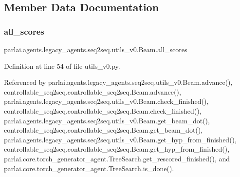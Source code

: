 \subsection{Member Data Documentation}
\mbox{\label{classparlai_1_1agents_1_1legacy__agents_1_1seq2seq_1_1utils__v0_1_1Beam_ae8e9fc9a712aef34dc78d40faf089d79}} 
\subsubsection{\texorpdfstring{all\+\_\+scores}{all\_scores}}
{\footnotesize\ttfamily parlai.\+agents.\+legacy\+\_\+agents.\+seq2seq.\+utils\+\_\+v0.\+Beam.\+all\+\_\+scores}



Definition at line 54 of file utils\+\_\+v0.\+py.



Referenced by parlai.\+agents.\+legacy\+\_\+agents.\+seq2seq.\+utils\+\_\+v0.\+Beam.\+advance(), controllable\+\_\+seq2seq.\+controllable\+\_\+seq2seq.\+Beam.\+advance(), parlai.\+agents.\+legacy\+\_\+agents.\+seq2seq.\+utils\+\_\+v0.\+Beam.\+check\+\_\+finished(), controllable\+\_\+seq2seq.\+controllable\+\_\+seq2seq.\+Beam.\+check\+\_\+finished(), parlai.\+agents.\+legacy\+\_\+agents.\+seq2seq.\+utils\+\_\+v0.\+Beam.\+get\+\_\+beam\+\_\+dot(), controllable\+\_\+seq2seq.\+controllable\+\_\+seq2seq.\+Beam.\+get\+\_\+beam\+\_\+dot(), parlai.\+agents.\+legacy\+\_\+agents.\+seq2seq.\+utils\+\_\+v0.\+Beam.\+get\+\_\+hyp\+\_\+from\+\_\+finished(), controllable\+\_\+seq2seq.\+controllable\+\_\+seq2seq.\+Beam.\+get\+\_\+hyp\+\_\+from\+\_\+finished(), parlai.\+core.\+torch\+\_\+generator\+\_\+agent.\+Tree\+Search.\+get\+\_\+rescored\+\_\+finished(), and parlai.\+core.\+torch\+\_\+generator\+\_\+agent.\+Tree\+Search.\+is\+\_\+done().

\mbox{\label{classparlai_1_1agents_1_1legacy__agents_1_1seq2seq_1_1utils__v0_1_1Beam_aa23d688e6e9c2d6ced98d57ac1a7059c}} 
